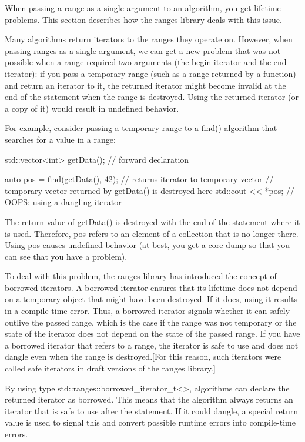 

When passing a range as a single argument to an algorithm, you get lifetime problems. This section describes how the ranges library deals with this issue.


Many algorithms return iterators to the ranges they operate on. However, when passing ranges as a single argument, we can get a new problem that was not possible when a range required two arguments (the begin iterator and the end iterator): if you pass a temporary range (such as a range returned by a function) and return an iterator to it, the returned iterator might become invalid at the end of the statement when the range is destroyed. Using the returned iterator (or a copy of it) would result in undefined behavior.

For example, consider passing a temporary range to a find() algorithm that searches for a value in a range:

\begin{cpp}
std::vector<int> getData(); // forward declaration

auto pos = find(getData(), 42); // returns iterator to temporary vector
// temporary vector returned by getData() is destroyed here
std::cout << *pos; // OOPS: using a dangling iterator
\end{cpp}

The return value of getData() is destroyed with the end of the statement where it is used. Therefore, pos refers to an element of a collection that is no longer there. Using pos causes undefined behavior (at best, you get a core dump so that you can see that you have a problem).

To deal with this problem, the ranges library has introduced the concept of borrowed iterators. A borrowed iterator ensures that its lifetime does not depend on a temporary object that might have been destroyed. If it does, using it results in a compile-time error. Thus, a borrowed iterator signals whether it can safely outlive the passed range, which is the case if the range was not temporary or the state of the iterator does not depend on the state of the passed range. If you have a borrowed iterator that refers to a range, the iterator is safe to use and does not dangle even when the range is destroyed.[For this reason, such iterators were called safe iterators in draft versions of the ranges library.] 

By using type std::ranges::borrowed\_iterator\_t<>, algorithms can declare the returned iterator as borrowed. This means that the algorithm always returns an iterator that is safe to use after the statement. If it could dangle, a special return value is used to signal this and convert possible runtime errors into compile-time errors.

